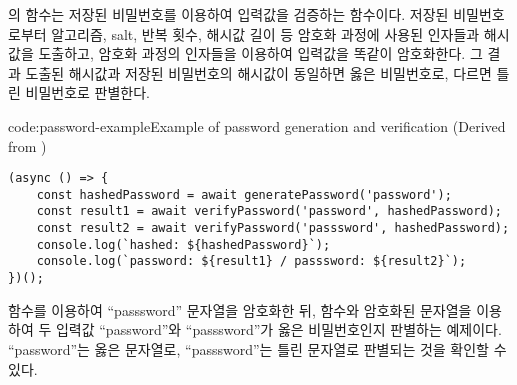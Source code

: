 의  함수는 저장된 비밀번호를 이용하여 입력값을 검증하는 함수이다. 저장된 비밀번호로부터 알고리즘, salt, 반복 횟수, 해시값 길이 등 암호화 과정에 사용된 인자들과 해시값을 도출하고, 암호화 과정의 인자들을 이용하여 입력값을 똑같이 암호화한다. 그 결과 도출된 해시값과 저장된 비밀번호의 해시값이 동일하면 옳은 비밀번호로, 다르면 틀린 비밀번호로 판별한다.

\begin{code}{code:password-example}{Example of password generation and verification (Derived from )}
\begin{verbatim}
(async () => {
    const hashedPassword = await generatePassword('password');
    const result1 = await verifyPassword('password', hashedPassword);
    const result2 = await verifyPassword('passsword', hashedPassword);
    console.log(`hashed: ${hashedPassword}`);
    console.log(`password: ${result1} / passsword: ${result2}`);
})();
\end{verbatim}
\end{code}

\은  함수를 이용하여 ``passsword'' 문자열을 암호화한 뒤,  함수와 암호화된 문자열을 이용하여 두 입력값 ``password''와 ``passsword''가 옳은 비밀번호인지 판별하는 예제이다. ``password''는 옳은 문자열로, ``passsword''는 틀린 문자열로 판별되는 것을 확인할 수 있다.
